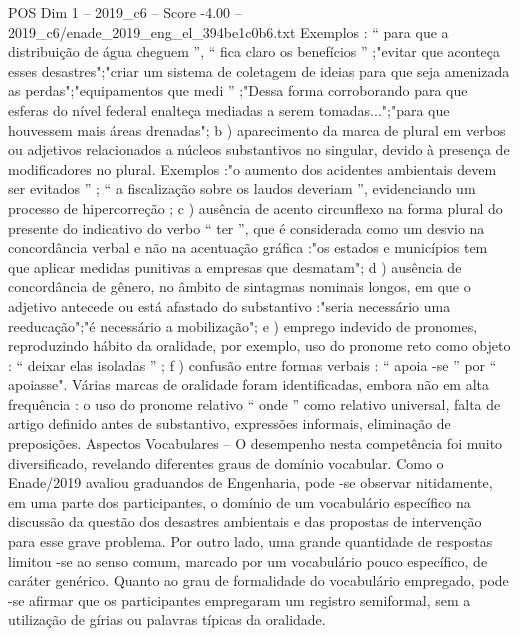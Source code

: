 \begin{textsample}{POS Dim 1 – 2019\_c6 – Score -4.00 – 2019\_c6/enade\_2019\_eng\_el\_394be1c0b6.txt}
Exemplos : “ para que a distribuição de água cheguem ”, “ fica claro os benefícios ” ;"evitar que aconteça esses desastres";"criar um sistema de coletagem de ideias para que seja amenizada as perdas";"equipamentos que medi ” ;"Dessa forma corroborando para que esferas do nível federal enalteça mediadas a serem tomadas...";"para que houvessem mais áreas drenadas"; b ) aparecimento da marca de plural em verbos ou adjetivos relacionados a núcleos substantivos no singular, devido à presença de modificadores no plural.
Exemplos :"o aumento dos acidentes ambientais devem ser evitados ” ; “ a fiscalização sobre os laudos deveriam ”, evidenciando um processo de hipercorreção ; c ) ausência de acento circunflexo na forma plural do presente do indicativo do verbo “ ter ”, que é considerada como um desvio na concordância verbal e não na acentuação gráfica :"os estados e municípios tem que aplicar medidas punitivas a empresas que desmatam"; d ) ausência de concordância de gênero, no âmbito de sintagmas nominais longos, em que o adjetivo antecede ou está afastado do substantivo :"seria necessário uma reeducação";"é necessário a mobilização"; e ) emprego indevido de pronomes, reproduzindo hábito da oralidade, por exemplo, uso do pronome reto como objeto : “ deixar elas isoladas ” ; f ) confusão entre formas verbais : “ apoia -se ” por “ apoiasse".
Várias marcas de oralidade foram identificadas, embora não em alta frequência : o uso do pronome relativo “ onde ” como relativo universal, falta de artigo definido antes de substantivo, expressões informais, eliminação de preposições.
Aspectos Vocabulares – O desempenho nesta competência foi muito diversificado, revelando diferentes graus de domínio vocabular.
Como o Enade/2019 avaliou graduandos de Engenharia, pode -se observar nitidamente, em uma parte dos participantes, o domínio de um vocabulário específico na discussão da questão dos desastres ambientais e das propostas de intervenção para esse grave problema.
Por outro lado, uma grande quantidade de respostas limitou -se ao senso comum, marcado por um vocabulário pouco específico, de caráter genérico.
Quanto ao grau de formalidade do vocabulário empregado, pode -se afirmar que os participantes empregaram um registro semiformal, sem a utilização de gírias ou palavras típicas da oralidade.

\end{textsample}
